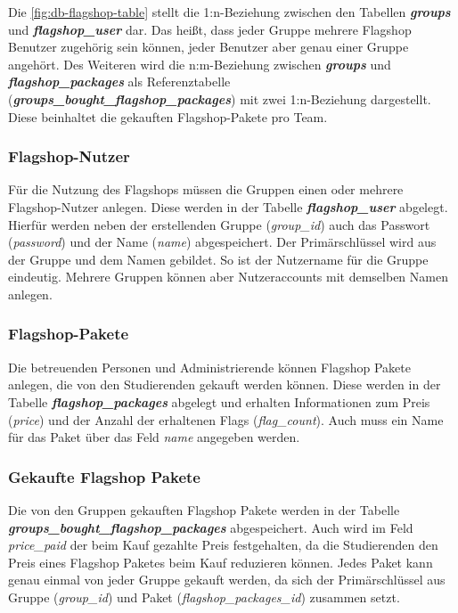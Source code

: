 Die \autoref{fig:db-flagshop-table} stellt die 1:n-Beziehung zwischen den Tabellen \textbf{\textit{groups}} und \textbf{\textit{flagshop\_user}} dar. Das heißt, dass jeder Gruppe mehrere Flagshop Benutzer zugehörig sein können, jeder Benutzer aber genau einer Gruppe angehört. Des Weiteren wird die n:m-Beziehung zwischen \textbf{\textit{groups}} und \textbf{\textit{flagshop\_packages}} als Referenztabelle\\ (\textbf{\textit{groups\_bought\_flagshop\_packages}}) mit zwei 1:n-Beziehung dargestellt. Diese beinhaltet die gekauften Flagshop-Pakete pro Team.

\subsubsection{Flagshop-Nutzer}
Für die Nutzung des Flagshops müssen die Gruppen einen oder mehrere Flagshop-Nutzer anlegen. Diese werden in der Tabelle \textbf{\textit{flagshop\_user}} abgelegt. Hierfür werden neben der erstellenden Gruppe (\textit{group\_id}) auch das Passwort (\textit{password}) und der Name (\textit{name}) abgespeichert. Der Primärschlüssel wird aus der Gruppe und dem Namen gebildet. So ist der Nutzername für die Gruppe eindeutig. Mehrere Gruppen können aber Nutzeraccounts mit demselben Namen anlegen.

\subsubsection{Flagshop-Pakete}
Die betreuenden Personen und Administrierende können Flagshop Pakete anlegen, die von den Studierenden gekauft werden können. Diese werden in der Tabelle \textbf{\textit{flagshop\_packages}} abgelegt und erhalten Informationen zum Preis (\textit{price}) und der Anzahl der erhaltenen Flags (\textit{flag\_count}). Auch muss ein Name für das Paket über das Feld \textit{name} angegeben werden.

\subsubsection{Gekaufte Flagshop Pakete}
Die von den Gruppen gekauften Flagshop Pakete werden in der Tabelle\\ \textbf{\textit{groups\_bought\_flagshop\_packages}} abgespeichert. Auch wird im Feld \textit{price\_paid} der beim Kauf gezahlte Preis festgehalten, da die Studierenden den Preis eines Flagshop Paketes beim Kauf reduzieren können. Jedes Paket kann genau einmal von jeder Gruppe gekauft werden, da sich der Primärschlüssel aus Gruppe (\textit{group\_id}) und Paket (\textit{flagshop\_packages\_id}) zusammen setzt.

